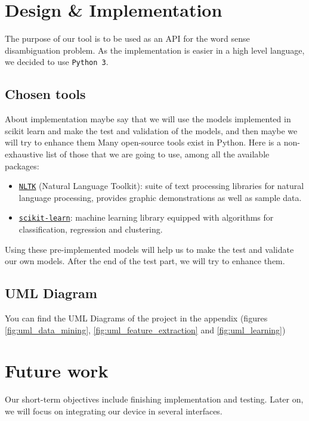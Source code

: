\documentclass[11pt,a4paper]{article}
\begin{document}
\newpage

\section{Design \& Implementation}

The purpose of our tool is to be used as an API for the word sense disambiguation problem. As the implementation is easier in a high level language, we decided to use \texttt{Python 3}.

\subsection{Chosen tools}
About implementation maybe say that we will use the models implemented in scikit learn and make the test and validation of the models, and then maybe we will try to enhance them
Many open-source tools exist in Python. Here is a non-exhaustive list of those that we are going to use, among all the available packages:
\begin{itemize}
    \item \href{http://www.nltk.org/}{\texttt{NLTK}} (Natural Language Toolkit): suite of text processing libraries for natural language processing, provides graphic demonstrations as well as sample data.
    \item \href{http://scikit-learn.org/}{\texttt{scikit-learn}}: machine learning library equipped with algorithms for classification, regression and clustering.
\end{itemize}
Using these pre-implemented models will help us to make the test and validate our own models. After the end of the test part, we will try to enhance them. 
\subsection{UML Diagram}

You can find the UML Diagrams of the project in the appendix (figures \ref{fig:uml_data_mining}, \ref{fig:uml_feature_extraction} and \ref{fig:uml_learning})

\newpage

\section{Future work}

Our short-term objectives include finishing implementation and testing. Later on, we will focus on integrating our device in several interfaces.
\end{document}
